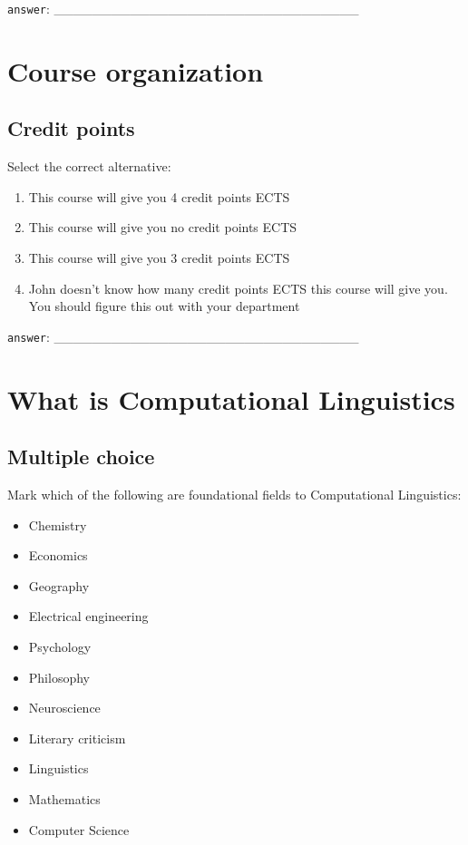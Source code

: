 \documentclass[a4paper,11pt]{scrartcl}
\begin{document}
\verb|answer|: \_\_\_\_\_\_\_\_\_\_\_\_\_\_\_\_\_\_\_\_\_\_\_\_\_\_\_\_\_\_\_\_


\section{Course organization}

\subsection{Credit points}

Select the correct alternative:

\begin{enumerate}[label=\alph*)]
\onehalfspacing

\item This course will give you 4 credit points ECTS

\item This course will give you no credit points ECTS

\item This course will give you 3 credit points ECTS

\item John doesn't know how many credit points ECTS this course will give you.
      You should figure this out with your department
\end{enumerate}

\verb|answer|: \_\_\_\_\_\_\_\_\_\_\_\_\_\_\_\_\_\_\_\_\_\_\_\_\_\_\_\_\_\_\_\_

\section{What is Computational Linguistics}

\subsection{Multiple choice}

Mark which of the following are foundational fields to Computational
Linguistics:

\begin{itemize}
\item Chemistry

\item Economics

\item Geography

\item Electrical engineering

\item Psychology

\item Philosophy

\item Neuroscience

\item Literary criticism

\item Linguistics

\item Mathematics

\item Computer Science
\end{itemize}
\end{document}
